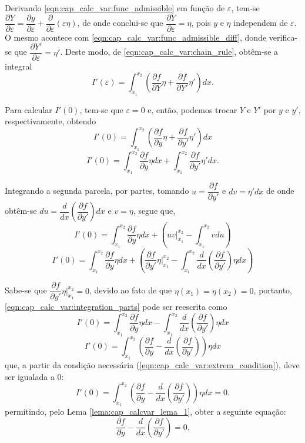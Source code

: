 \documentclass[
	12pt,				%
	openright,			%
    twoside,			%
	a4paper,			%
	chapter=TITLE,		%
	english,			%
	french,				%
	spanish,			%
	brazil				%
	]{abntex2}
\numberwithin{lema}{chapter}
\numberwithin{teorema}{chapter}
\numberwithin{definicao}{chapter}
\numberwithin{exemplo}{chapter}
\numberwithin{figure}{chapter}
\begin{document}
Derivando \eqref{eqn:cap_calc_var:func_admissible} em função de $\varepsilon$, tem-se $\dfrac{\partial Y}{\partial \varepsilon}=\dfrac{\partial y}{\partial \varepsilon}+\dfrac{\partial}{\partial \varepsilon}(\varepsilon \eta)$, de onde conclui-se que $\dfrac{\partial Y}{\partial \varepsilon}=\eta$, pois $y$ e $\eta$ independem de $\varepsilon$. O mesmo acontece com \eqref{eqn:cap_calc_var:func_admissible_diff}, donde verifica-se que $\dfrac{\partial Y'}{\partial \varepsilon}=\eta'$. Deste modo, de \eqref{eqn:cap_calc_var:chain_rule}, obtêm-se a integral
$$I'(\varepsilon)=\int_{x_1}^{x_2}\left ( 
	\frac{\partial f}{\partial Y} \eta +
	\frac{\partial f}{\partial Y'} \eta '
\right )dx \text{.}
$$

Para calcular $I'(0)$, tem-se que $\varepsilon=0$ e, então, podemos trocar $Y$ e $Y'$ por $y$ e $y'$, respectivamente, obtendo
$$
I'(0)=\int_{x_1}^{x_2}\left (
	\frac{\partial f}{\partial y} \eta +
	\frac{\partial f}{\partial y'} \eta '
\right )dx
$$
$$
I'(0)=
	\int_{x_1}^{x_2} \frac{\partial f}{\partial y}\eta dx
	+
	\int_{x_1}^{x_2} \frac{\partial f}{\partial y'}\eta' dx \text{.}
$$

Integrando a segunda parcela, por partes, tomando $u=\dfrac{\partial f}{\partial y'}$ e $dv=\eta'dx$ de onde obtêm-se $du=\dfrac{d}{dx}\left ( \dfrac{\partial f}{\partial y'} \right )dx$ e $v=\eta$, segue que,
$$
I'(0)=
	\int_{x_1}^{x_2} \frac{\partial f}{\partial y}\eta dx
	+
	\left (
	uv \Big|_{x_1}^{x_2} - \int_{x_1}^{x_2}vdu
	\right )
$$
\begin{equation}\label{eqn:cap_calc_var:integration_parts}
I'(0)=
	\int_{x_1}^{x_2} \frac{\partial f}{\partial y}\eta dx
	+
	\left (
		\frac{\partial f}{\partial y'}\eta \Biggr|_{x_1}^{x_2} - \int_{x_1}^{x_2} \frac{d}{dx}\left ( \frac{\partial f}{\partial y'} \right ) \eta dx
	\right )
\end{equation}

Sabe-se que $\dfrac{\partial f}{\partial y'}\eta \Big |_{x_1}^{x_2}=0$, devido ao fato de que $\eta(x_1)=\eta(x_2)=0$, portanto, \eqref{eqn:cap_calc_var:integration_parts} pode ser reescrita como
\begin{equation}
	\label{eqn:cap_calc_var:func_admitindo_eta_0}
	I'(0)=
		\int_{x_1}^{x_2} \frac{\partial f}{\partial y}\eta dx
		-
		\int_{x_1}^{x_2} \frac{d}{dx} \left ( \frac{\partial f}{\partial y'} \right ) \eta dx
\end{equation}
$$
I'(0)=\int_{x_1}^{x_2}\left (
	\frac{\partial f}{\partial y} -
	\frac{d}{dx}
	\left (
		\frac{\partial f}{\partial y'}
	\right )
\right )\eta dx
$$
que, a partir da condição necessária (\ref{eqn:cap_calc_var:extrem_condition}), deve ser igualada a $0$:
$$
I'(0)=\int_{x_1}^{x_2}\left (
	\frac{\partial f}{\partial y} -
	\frac{d}{dx}
	\left (
		\frac{\partial f}{\partial y'}
	\right )
\right )\eta dx = 0	\text{.}
$$
permitindo, pelo Lema \ref{lema:cap_calcvar_lema_1}, obter a seguinte equação:
\begin{equation}\label{eqn:cap_calc_var:euler_lagrange}
\frac{\partial f}{\partial y} - \frac{d}{dx} \left ( \frac{\partial f}{\partial y'} \right )=0 \text{.}
\end{equation}
\end{document}
